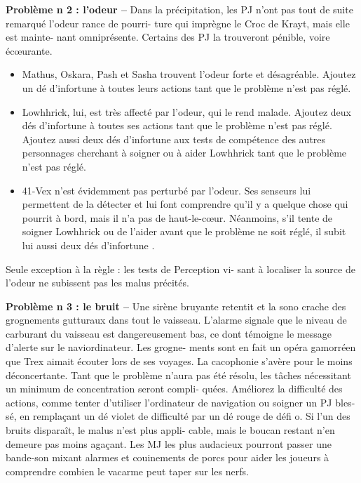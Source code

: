\documentclass[a4paper,10pt,twoside,twocolumn,openany]{book}
\begin{document}
\textbf{Problème n 2 : l’odeur –} Dans la précipitation, les PJ
n’ont pas tout de suite remarqué l’odeur rance de pourri-
ture qui imprègne le Croc de Krayt, mais elle est mainte-
nant omniprésente. Certains des PJ la trouveront pénible,
voire écœurante.
\begin{itemize}
\item Mathus, Oskara, Pash et Sasha trouvent l’odeur forte et désagréable. Ajoutez un dé d’infortune \boost à toutes leurs actions tant que le problème n’est pas réglé. 
\item Lowhhrick, lui, est très affecté par l’odeur, qui le rend malade. Ajoutez deux dés d’infortune \boost à toutes ses actions tant que le problème n’est pas réglé. Ajoutez aussi deux dés d’infortune \boost aux tests de compétence des autres personnages cherchant à soigner ou à aider Lowhhrick tant que le problème n’est pas réglé.
\item 41-Vex n’est évidemment pas perturbé par l’odeur. Ses senseurs lui permettent de la détecter et lui font comprendre qu’il y a quelque chose qui pourrit à bord, mais il n’a pas de haut-le-cœur. Néanmoins, s’il tente de soigner Lowhhrick ou de l’aider avant que le problème ne soit réglé, il subit lui aussi deux dés d’infortune \boost.
\end{itemize}

Seule exception à la règle : les tests de Perception vi-
sant à localiser la source de l’odeur ne subissent pas les
malus précités.

\textbf{Problème n 3 : le bruit –} Une sirène bruyante retentit
et la sono crache des grognements gutturaux dans tout
le vaisseau. L’alarme signale que le niveau de carburant
du vaisseau est dangereusement bas, ce dont témoigne
le message d’alerte sur le naviordinateur. Les grogne-
ments sont en fait un opéra gamorréen que Trex aimait
écouter lors de ses voyages. La cacophonie s’avère pour
le moins déconcertante.
Tant que le problème n’aura pas été résolu, les tâches
nécessitant un minimum de concentration seront compli-
quées. Améliorez la difficulté des actions, comme tenter
d’utiliser l’ordinateur de navigation ou soigner un PJ bles-
sé, en remplaçant un dé violet de difficulté \difficulty par un dé
rouge de défi o.
Si l’un des bruits disparaît, le malus n’est plus appli-
cable, mais le boucan restant n’en demeure pas moins
agaçant. Les MJ les plus audacieux pourront passer une bande-son mixant alarmes et couinements de porcs pour
aider les joueurs à comprendre combien le vacarme peut
taper sur les nerfs.
\end{document}
